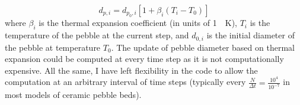 \begin{equation}
	d_{p,i} = d_{p_0,i}\left[1+\beta_i\left(T_i - T_0\right)\right]
\end{equation}
where $\beta_i$ is the thermal expansion coefficient (in units of \SI{1}{\per\kelvin}), $T_i$ is the temperature of the pebble at the current step, and $d_{0,i}$ is the initial diameter of the pebble at temperature $T_0$. The update of pebble diameter based on thermal expansion could be computed at every time step as it is not computationally expensive. All the same, I have left flexibility in the code to allow the computation at an arbitrary interval of time steps (typically every $\frac{N}{\Delta t} = \frac{10^4}{10^{-7}}$ in most models of ceramic pebble beds).

